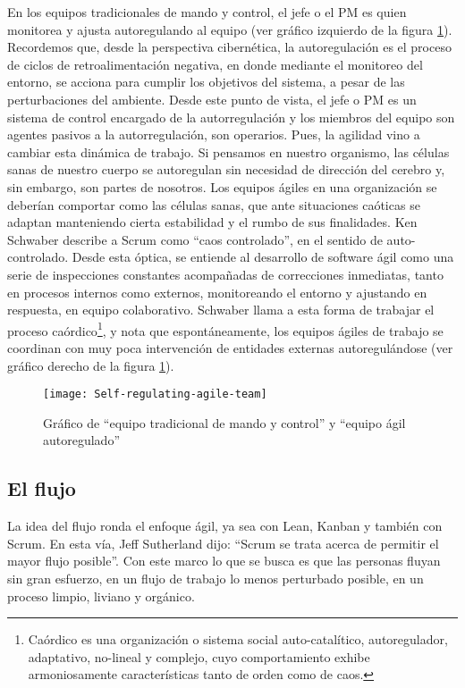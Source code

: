 En los equipos tradicionales de mando y control, el jefe o el PM es quien monitorea y ajusta autoregulando al equipo (ver gráfico izquierdo de la figura \ref{fig:Self-regulating-agile-team}). Recordemos que, desde la perspectiva cibernética, la autoregulación es el proceso de ciclos de retroalimentación negativa, en donde mediante el monitoreo del entorno, se acciona para cumplir los objetivos del sistema, a pesar de las perturbaciones del ambiente. Desde este punto de vista, el jefe o PM es un sistema de control encargado de la autorregulación y los miembros del equipo son agentes pasivos a la autorregulación, son operarios. Pues, la agilidad vino a cambiar esta dinámica de trabajo.
Si pensamos en nuestro organismo, las células sanas de nuestro cuerpo se autoregulan sin necesidad de dirección del cerebro y, sin embargo, son partes de nosotros. Los equipos ágiles en una organización se deberían comportar como las células sanas, que ante situaciones caóticas se adaptan manteniendo cierta estabilidad y el rumbo de sus finalidades. Ken Schwaber describe a Scrum como “caos controlado”, en el sentido de auto-controlado. Desde esta óptica, se entiende al desarrollo de software ágil como una serie de inspecciones constantes acompañadas de correcciones inmediatas, tanto en procesos internos como externos, monitoreando el entorno y ajustando en respuesta, en equipo colaborativo. Schwaber llama a esta forma de trabajar el proceso caórdico\footnote{Caórdico es una organización o sistema social auto-catalítico, autoregulador, adaptativo, no-lineal y complejo, cuyo comportamiento exhibe armoniosamente características tanto de orden como de caos.}, y nota que espontáneamente, los equipos ágiles de trabajo se coordinan con muy poca intervención de entidades externas autoregulándose (ver gráfico derecho de la figura \ref{fig:Self-regulating-agile-team}). 

\begin{figure}[h] 
  \centering
  \texttt{[image: Self-regulating-agile-team]}
  \caption{Gráfico de “equipo tradicional de mando y control” y “equipo ágil autoregulado”}
  \centering
  \label{fig:Self-regulating-agile-team} %
\end{figure}

\subsection{El flujo}

La idea del flujo ronda el enfoque ágil, ya sea con Lean, Kanban y también con Scrum. En esta vía, Jeff Sutherland dijo: “Scrum se trata acerca de permitir el mayor flujo posible”. Con este marco lo que se busca es que las personas fluyan sin gran esfuerzo, en un flujo de trabajo lo menos perturbado posible, en un proceso limpio, liviano y orgánico. 

